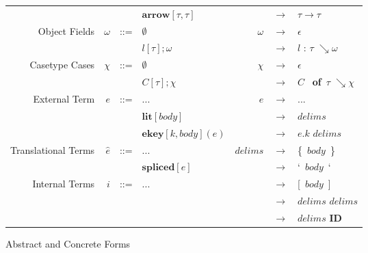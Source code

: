 \documentclass{sig-alternate}
\makeatletter
\newcommand\BeraMonottfamily{%
  \def\fvm@Scale{0.85}%
  \fontfamily{fvm}\selectfont%
}
\newcommand{\textcd}[1]{\textbf{\scriptsize\BeraMonottfamily{#1}}}
\makeatother
\begin{document}
\begin{figure*}
\begin{center}
\begin{tabular}{ r r l l r c l}
                      &                   &     &  $\mathbf{arrow}[\tau, \tau]$     &           & $\rightarrow$ & $\tau\rightarrow\tau$\\
  Object Fields       & $\omega$          & ::= &  $\emptyset$                      & $\omega$  & $\rightarrow$ & $\epsilon$\\
                      &                   & &  $l[\tau];\omega$                 &           & $\rightarrow$ & $l$ : $\tau$ $\searrow\omega$\\
  Casetype Cases      & $\chi$            & ::= &  $\emptyset$                      & $\chi$    & $\rightarrow$ & $\epsilon$ \\                 
                      &                   &     &  $C[\tau];\chi$                   &           & $\rightarrow$ & $C$~\textcd{of}~$\tau$ $\searrow\chi$\\
  External Term       & $e$               & ::= &  ...                              & $e$       & $\rightarrow$ & $...$\\
                      &                   &     &  $\mathbf{lit}[body]$             &           & $\rightarrow$ & $delims$\\
                      &                   &     &  $\mathbf{ekey}[k,body](e)$       &           & $\rightarrow$ & $e.k$ $delims$\\
  Translational Terms & $\hat{e}$         & ::= &  ...                              &  $delims$ & $\rightarrow$ & \{~$body$~\}\\
                      &                   &     &  $\mathbf{spliced}[e]$            &           & $\rightarrow$ & `~$body$~`\\
  Internal Terms      & $i$               & ::= &  ...                              &           & $\rightarrow$ & [~$body$~]\\
                      &                   &     &                                   &           & $\rightarrow$ & $delims$ $delims$\\
                      &                   &     &                                   &           & $\rightarrow$ & $delims$ \textcd{ID}\\                                                          
\end{tabular}
\end{center}
\caption{Abstract and Concrete Forms }
\label{formal-syntax}
\end{figure*}
\end{document}
